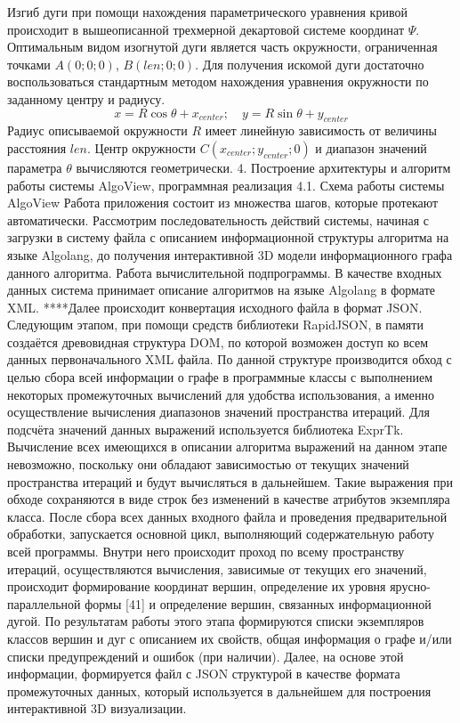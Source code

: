 Изгиб дуги при помощи нахождения параметрического уравнения кривой происходит в вышеописанной трехмерной декартовой системе координат $\Psi$. Оптимальным видом изогнутой дуги является часть окружности, ограниченная точками $A(0; 0; 0)$, $B\left(len; 0; 0 \right)$. Для получения искомой дуги достаточно воспользоваться стандартным методом нахождения уравнения окружности по заданному центру и радиусу.
$$ x = R\cos\theta + x_{center}; \quad y = R\sin\theta + y_{center} $$
Радиус описываемой окружности $R$ имеет линейную зависимость от величины расстояния $len$. Центр окружности $C(x_{center}; y_{center}; 0)$ и диапазон значений параметра $\theta$ вычисляются геометрически.
4. Построение архитектуры и алгоритм работы системы AlgoView, программная реализация
4.1. Схема работы системы AlgoView
Работа приложения состоит из множества шагов, которые протекают автоматически. Рассмотрим последовательность действий системы, начиная с загрузки в систему файла с описанием информационной структуры алгоритма на языке Algolang, до получения интерактивной 3D модели информационного графа данного алгоритма.
Работа вычислительной подпрограммы.
В качестве входных данных система принимает описание алгоритмов на языке Algolang в формате XML. ****Далее происходит конвертация исходного файла в формат JSON. Следующим этапом, при помощи средств библиотеки RapidJSON, в памяти создаётся древовидная структура DOM, по которой возможен доступ ко всем данных первоначального XML файла. По данной структуре производится обход с целью сбора всей информации о графе в программные классы с выполнением некоторых промежуточных вычислений для удобства использования, а именно осуществление вычисления диапазонов значений пространства итераций. Для подсчёта значений данных выражений используется библиотека ExprTk. Вычисление всех имеющихся в описании алгоритма выражений на данном этапе невозможно, поскольку они обладают зависимостью от текущих значений пространства итераций и будут вычисляться в дальнейшем. Такие выражения при обходе сохраняются в виде строк без изменений в качестве атрибутов экземпляра класса. После сбора всех данных входного файла и проведения предварительной обработки, запускается основной цикл, выполняющий содержательную работу всей программы. Внутри него происходит проход по всему пространству итераций, осуществляются вычисления, зависимые от текущих его значений, происходит формирование координат вершин, определение их уровня ярусно-параллельной формы [41] и определение вершин, связанных информационной дугой.
По результатам работы этого этапа формируются списки экземпляров классов вершин и дуг с описанием их свойств, общая информация о графе и/или списки предупреждений и ошибок (при наличии). Далее, на основе этой информации, формируется файл с JSON структурой в качестве формата промежуточных данных, который используется в дальнейшем для построения интерактивной 3D визуализации.
